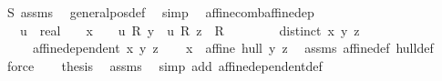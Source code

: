\begin{isabellebody}
\ S{\isacharparenleft}{\kern0pt}{}{\isacharparenright}{\kern0pt}\ assms{\isacharparenleft}{\kern0pt}{}{\isacharparenright}{\kern0pt}\ \isamarkupfalse%
\ general{\isacharunderscore}{\kern0pt}pos{\isacharunderscore}{\kern0pt}def\ \isamarkupfalse%
\ simp\ \isanewline
{}\isamarkupfalse%
%
\endisatagproof
{\isafoldproof}%
%
\isadelimproof
\isanewline
%
\endisadelimproof
\isanewline
\isanewline
{}\isamarkupfalse%
\ affine{\isacharunderscore}{\kern0pt}comb{\isacharunderscore}{\kern0pt}affine{\isacharunderscore}{\kern0pt}dep{\isacharcolon}{\kern0pt}\isanewline
\ \ \ {\isachardoublequoteopen}{\isacharparenleft}{\kern0pt}u\ {\isacharcolon}{\kern0pt}{\isacharcolon}{\kern0pt}\ real{\isacharparenright}{\kern0pt}\ {\isasymge}\ {}{\isachardoublequoteclose}\ \ {\isachardoublequoteopen}x\ {\isacharequal}{\kern0pt}\ {\isacharparenleft}{\kern0pt}{}\ {\isacharminus}{\kern0pt}\ u{\isacharparenright}{\kern0pt}\ {\isacharasterisk}{\kern0pt}\isactrlsub R\ y\ {\isacharplus}{\kern0pt}\ u\ {\isacharasterisk}{\kern0pt}\isactrlsub R\ {\isacharparenleft}{\kern0pt}z\ {\isacharcolon}{\kern0pt}{\isacharcolon}{\kern0pt}\ R{}{\isacharparenright}{\kern0pt}{\isachardoublequoteclose}\ \isanewline
\ \ \ \ \ \ \ {\isachardoublequoteopen}distinct\ {\isacharbrackleft}{\kern0pt}x{\isacharcomma}{\kern0pt}\ y{\isacharcomma}{\kern0pt}\ z{\isacharbrackright}{\kern0pt}{\isachardoublequoteclose}\isanewline
\ \ \ \ \ {\isachardoublequoteopen}affine{\isacharunderscore}{\kern0pt}dependent\ {\isacharbraceleft}{\kern0pt}x{\isacharcomma}{\kern0pt}\ y{\isacharcomma}{\kern0pt}\ z{\isacharbraceright}{\kern0pt}{\isachardoublequoteclose}\isanewline
%
\isadelimproof
%
\endisadelimproof
%
\isatagproof
{}\isamarkupfalse%
{\isacharminus}{\kern0pt}\isanewline
\ \ \isamarkupfalse%
\ {\isachardoublequoteopen}x\ {\isasymin}\ affine\ hull\ {\isacharbraceleft}{\kern0pt}y{\isacharcomma}{\kern0pt}\ z{\isacharbraceright}{\kern0pt}{\isachardoublequoteclose}\ \isamarkupfalse%
\ assms\ affine{\isacharunderscore}{\kern0pt}def\ hull{\isacharunderscore}{\kern0pt}def\ \isamarkupfalse%
\ force\isanewline
\ \ \isamarkupfalse%
\ {\isacharquery}{\kern0pt}thesis\ \isamarkupfalse%
\ assms\ \isamarkupfalse%
\ {\isacharparenleft}{\kern0pt}simp\ add{\isacharcolon}{\kern0pt}\ affine{\isacharunderscore}{\kern0pt}dependent{\isacharunderscore}{\kern0pt}def{\isacharparenright}{\kern0pt}\isanewline

\end{isabellebody}
